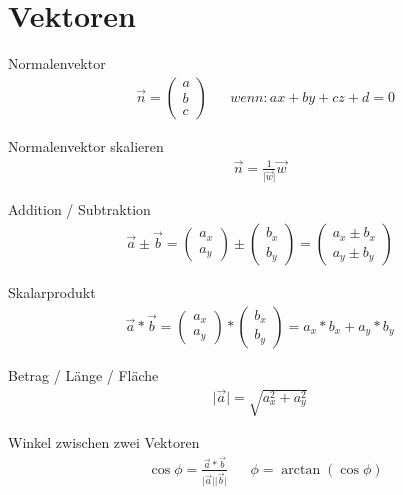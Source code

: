\documentclass[17pt]{extarticle}
\newcommand{\norm}[1]{\lvert #1 \rvert}
\begin{document}
\section{Vektoren}
	Normalenvektor
	\begin{align}
		&\vec{n} =
		\begin{pmatrix} a \\ b \\ c \end{pmatrix}		
		&&wenn: ax + by + cz + d = 0
	\end{align}
	
	Normalenvektor skalieren
	\begin{align}
		\vec{n} = \frac{1}{\norm{\vec{w}}} \vec{w}
	\end{align}

	Addition / Subtraktion
	\begin{align}	
		\vec{a} \pm \vec{b} = 
		\begin{pmatrix} a_x \\ a_y \end{pmatrix}
		\pm
		\begin{pmatrix} b_x \\ b_y \end{pmatrix}
		=
		\begin{pmatrix} a_x \pm b_x \\ a_y \pm b_y \end{pmatrix}
	\end{align}
	
	Skalarprodukt 	
	\begin{align}	
	\vec{a} * \vec{b} = 
	\begin{pmatrix} a_x \\ a_y \end{pmatrix}
	*
	\begin{pmatrix} b_x \\ b_y \end{pmatrix}
	= a_x * b_x + a_y * b_y
	\end{align}
	
	Betrag / Länge / Fläche
	\begin{align}
		\norm{\vec{a}} = \sqrt{a_x^2 + a_y^2}
	\end{align}
	
	Winkel zwischen zwei Vektoren
	\begin{align}
		&\cos \phi = \frac{\vec{a} * \vec{b}}{\norm{\vec{a}} \norm{\vec{b}}}
		&&\phi = \arctan(\cos \phi)
	\end{align}
	
\end{document}

